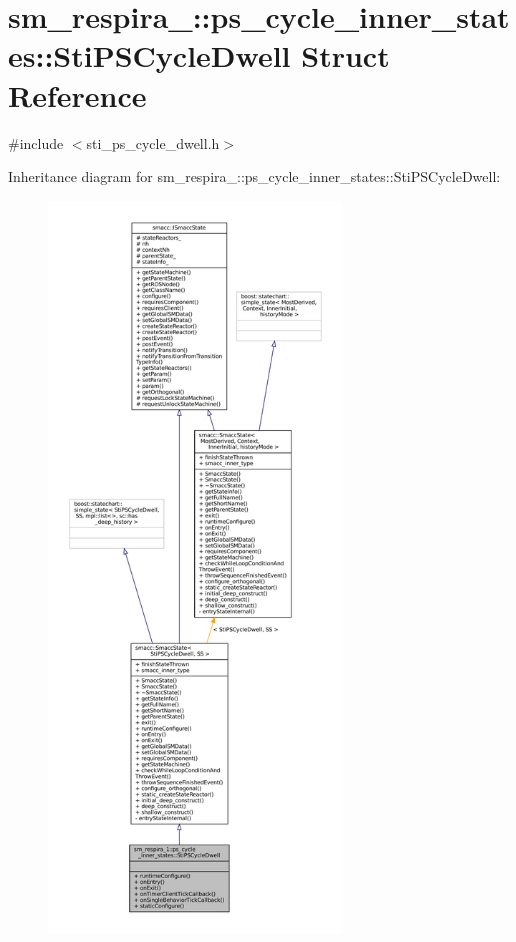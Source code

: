 \hypertarget{structsm__respira__1_1_1ps__cycle__inner__states_1_1StiPSCycleDwell}{}\section{sm\+\_\+respira\+\_\+:\+:ps\+\_\+cycle\+\_\+inner\+\_\+states\+:\+:Sti\+P\+S\+Cycle\+Dwell Struct Reference}
\label{structsm__respira__1_1_1ps__cycle__inner__states_1_1StiPSCycleDwell}


{\ttfamily \#include $<$sti\+\_\+ps\+\_\+cycle\+\_\+dwell.\+h$>$}



Inheritance diagram for sm\+\_\+respira\+\_\+:\+:ps\+\_\+cycle\+\_\+inner\+\_\+states\+:\+:Sti\+P\+S\+Cycle\+Dwell\+:
\nopagebreak
\begin{figure}[H]
\begin{center}
\leavevmode
\includegraphics[height=550pt]{structsm__respira__1_1_1ps__cycle__inner__states_1_1StiPSCycleDwell__inherit__graph}
\end{center}
\end{figure}


